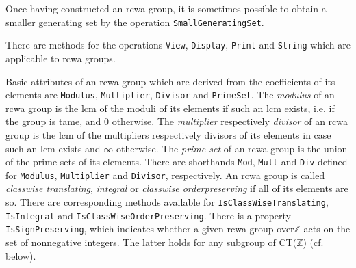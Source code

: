 \documentclass[a4paper,11pt]{report}
\begin{document}
{{  Once having constructed an rcwa group, it is sometimes possible to obtain a
smaller generating set by the operation \texttt{SmallGeneratingSet}. 

     There are methods for the operations \texttt{View}, \texttt{Display}, \texttt{Print} and \texttt{String} which are applicable to rcwa groups. 

                     Basic attributes of an rcwa group which are derived from the coefficients of
its elements are \texttt{Modulus}, \texttt{Multiplier}, \texttt{Divisor} and \texttt{PrimeSet}. The \emph{modulus} of an rcwa group is the lcm of the moduli of its elements if such an lcm
exists, i.e. if the group is tame, and 0 otherwise. The \emph{multiplier} respectively \emph{divisor} of an rcwa group is the lcm of the multipliers respectively divisors of its
elements in case such an lcm exists and $\infty$ otherwise. The \emph{prime set} of an rcwa group is the union of the prime sets of its elements. There are
shorthands \texttt{Mod}, \texttt{Mult} and \texttt{Div} defined for \texttt{Modulus}, \texttt{Multiplier} and \texttt{Divisor}, respectively. An rcwa group is called \emph{class\texttt{}wise translating}, \emph{integral} or \emph{class\texttt{}wise order\texttt{}preserving} if all of its elements are so. There are corresponding methods available for \texttt{IsClassWiseTranslating}, \texttt{IsIntegral} and \texttt{IsClassWiseOrderPreserving}. There is a property \texttt{IsSignPreserving}, which indicates whether a given rcwa group
over{\nobreakspace}{\ensuremath{\mathbb Z}} acts on the set of nonnegative
integers. The latter holds for any subgroup of CT({\ensuremath{\mathbb Z}})
(cf. below). 
\begin{Verbatim}[commandchars=!@|,fontsize=\small,frame=single,label=Example]
  

\end{Verbatim}}}
\end{document}
